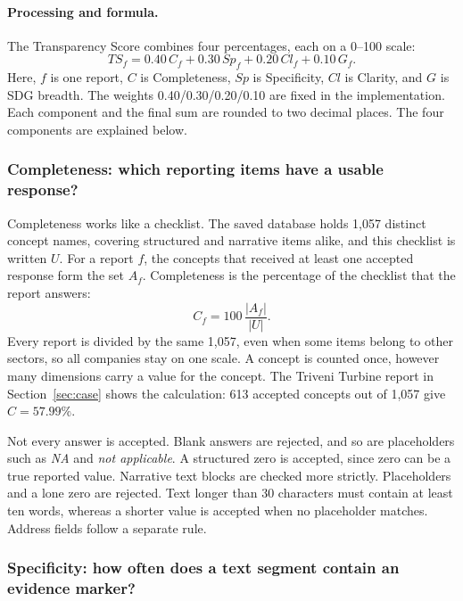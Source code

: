 \paragraph{Processing and formula.} The Transparency Score combines four percentages, each on a 0--100 scale:
\begin{equation}
TS_f=0.40\,C_f+0.30\,Sp_f+0.20\,Cl_f+0.10\,G_f.
\label{eq:ts}
\end{equation}
Here, $f$ is one report, $C$ is Completeness, $Sp$ is Specificity, $Cl$ is Clarity, and $G$ is SDG breadth. The weights 0.40/0.30/0.20/0.10 are fixed in the implementation. Each component and the final sum are rounded to two decimal places. The four components are explained below.

\subsubsection{Completeness: which reporting items have a usable response?}

Completeness works like a checklist. The saved database holds 1,057 distinct concept names, covering structured and narrative items alike, and this checklist is written $U$. For a report $f$, the concepts that received at least one accepted response form the set $A_f$. Completeness is the percentage of the checklist that the report answers:
\begin{equation}
C_f=100\,\frac{|A_f|}{|U|}.
\label{eq:complete}
\end{equation}
Every report is divided by the same 1,057, even when some items belong to other sectors, so all companies stay on one scale. A concept is counted once, however many dimensions carry a value for the concept. The Triveni Turbine report in Section~\ref{sec:case} shows the calculation: 613 accepted concepts out of 1,057 give $C=57.99\%$.

Not every answer is accepted. Blank answers are rejected, and so are placeholders such as \emph{NA} and \emph{not applicable}. A structured zero is accepted, since zero can be a true reported value. Narrative text blocks are checked more strictly. Placeholders and a lone zero are rejected. Text longer than 30 characters must contain at least ten words, whereas a shorter value is accepted when no placeholder matches. Address fields follow a separate rule.

\subsubsection{Specificity: how often does a text segment contain an evidence marker?}

